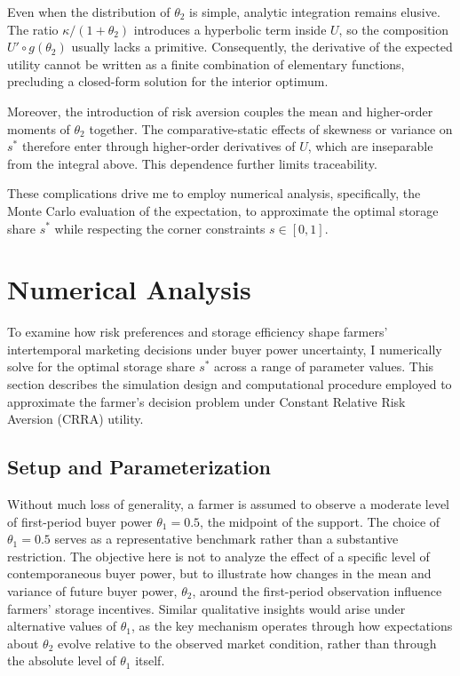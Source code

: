 Even when the distribution of $\theta_2$ is simple, analytic integration remains elusive. The ratio $\kappa/(1+\theta_2)$ introduces a hyperbolic term inside $U$, so the composition $U'\circ g(\theta_2)$ usually lacks a primitive.  Consequently, the derivative of the expected utility cannot be written as a finite combination of elementary functions, precluding a closed-form solution for the interior optimum. 

Moreover, the introduction of risk aversion couples the mean and higher-order moments of $\theta_2$ together. The comparative-static effects of skewness or variance on $s^{*}$ therefore enter through higher-order derivatives of $U$, which are inseparable from the integral above.  This dependence further limits traceability.


These complications drive me to employ numerical analysis, specifically, the Monte Carlo evaluation of the expectation, to approximate the optimal storage share $s^{*}$ while respecting the corner constraints $s\in[0,1]$.





\section{Numerical Analysis} \label{Section: Base Model Numerical Analysis}
\noindent To examine how risk preferences and storage efficiency shape farmers' intertemporal marketing decisions under buyer power uncertainty, I numerically solve for the optimal storage share $s^*$ across a range of parameter values. This section describes the simulation design and computational procedure employed to approximate the farmer's decision problem under Constant Relative Risk Aversion (CRRA) utility.


\subsection{Setup and Parameterization}
\noindent Without much loss of generality, a farmer is assumed to observe a moderate level of first-period buyer power $\theta_1 = 0.5$, the midpoint of the support. The choice of $\theta_1 = 0.5$ serves as a representative benchmark rather than a substantive restriction. The objective here is not to analyze the effect of a specific level of contemporaneous buyer power, but to illustrate how changes in the mean and variance of future buyer power, $\theta_2$, around the first-period observation influence farmers' storage incentives. Similar qualitative insights would arise under alternative values of $\theta_1$, as the key mechanism operates through how expectations about $\theta_2$ evolve relative to the observed market condition, rather than through the absolute level of $\theta_1$ itself.



